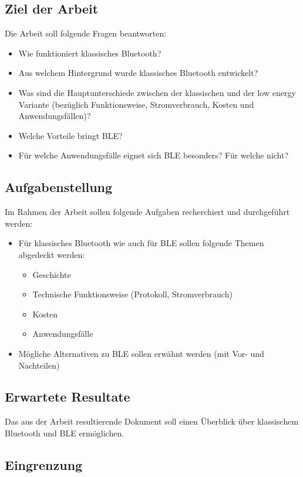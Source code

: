\subsection{Ziel der Arbeit}
Die Arbeit soll folgende Fragen beantworten:
\begin{itemize}
	\item Wie funktioniert klassisches Bluetooth?
	\item Aus welchem Hintergrund wurde klassisches Bluetooth entwickelt?
	\item Was sind die Hauptunterschiede zwischen der klassischen und der low energy Variante (bezüglich Funktionsweise, Stromverbrauch, Kosten und Anwendungsfällen)?
	\item Welche Vorteile bringt BLE?
	\item Für welche Anwendungsfälle eignet sich BLE besonders? Für welche nicht?
\end{itemize}

\subsection{Aufgabenstellung}
Im Rahmen der Arbeit sollen folgende Aufgaben recherchiert und durchgeführt werden:
\begin{itemize}
	\item Für klassisches Bluetooth wie auch für BLE sollen folgende Themen abgedeckt werden:
	\begin{itemize}
		\item Geschichte
		\item Technische Funktionsweise (Protokoll, Stromverbrauch)
		\item Kosten
		\item Anwendungsfälle
	\end{itemize}
	\item Mögliche Alternativen zu BLE sollen erwähnt werden (mit Vor- und Nachteilen)
\end{itemize}

\subsection{Erwartete Resultate}
Das aus der Arbeit resultierende Dokument soll einen Überblick über klassischem Bluetooth und BLE ermöglichen.

\subsection{Eingrenzung}


